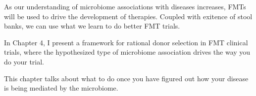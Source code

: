 As our understanding of microbiome associations with diseases increases, FMTs will be used to drive the development of therapies. Coupled with exitence of stool banks, we can use what we learn to do better FMT trials.

In Chapter 4, I present a framework for rational donor selection in FMT clinical trials, where the hypothesized type of microbiome association drives the way you do your trial.

This chapter talks about what to do once you have figured out how your disease is being mediated by the microbiome.

\begin{singlespace}


\end{singlespace}
